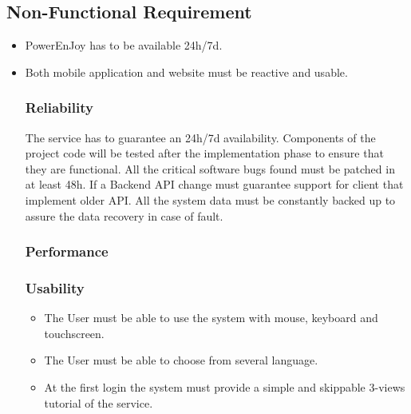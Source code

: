 \documentclass[english]{article}
\begin{document}
\subsection{Non-Functional Requirement}

\begin{itemize}
	\item PowerEnJoy has to be available 24h/7d.
	\item Both mobile application and website must be reactive and usable.
	
\subsubsection{Reliability}%

The service has to guarantee an 24h/7d availability. Components of the project code will be tested after the implementation phase to ensure that they are functional. 
All the critical software bugs found must be patched in at least 48h.
If a Backend API change must guarantee support for client that implement older API.
All the system data must be constantly backed up to assure the data recovery in case of fault.


\subsubsection{Performance}

\subsubsection{Usability}
\begin{itemize}
	\item The User must be able to use the system with mouse, keyboard and touchscreen.
	\item The User must be able to choose from several language.
	\item At the first login the system must provide a simple and skippable 3-views tutorial of the service.
\end{itemize}


\end{itemize}
\end{document}
